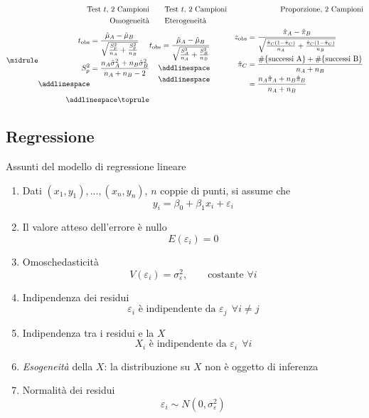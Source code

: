\documentclass[
  11pt,
]{book}
\providecommand{\tightlist}{%
  \setlength{\itemsep}{0pt}\setlength{\parskip}{0pt}}
\theoremstyle{mytheoremstyle}
\theoremstyle{mydefstyle}
\begin{document}
\begin{align*}
    \text{Test $t$, 2 Campioni} &
    \text{\qquad Test $t$, 2 Campioni} &
    \text{Proporzione, 2 Campioni} \\
    \text{Omogeneità} &
    \text{\qquad Eterogeneità} &
     \\
    \midrule
    \begin{aligned}
      t_{\text{obs}}&=\frac{\hat\mu_A-\hat\mu_B}{\sqrt{\frac{S_p^2}{n_A}+\frac{S_p^2}{n_B}}}\\
      S^2_p &= \frac{n_A\hat\sigma_A^2+n_B\hat\sigma_B^2}{n_A+n_B-2}\\
      \addlinespace \\
    \end{aligned} &
    \begin{aligned}
      \displaystyle t_{\text{obs}}=\frac{\hat\mu_A-\hat\mu_B}{\sqrt{\frac{S_A^2}{n_A}+\frac{S_B^2}{n_B}}}\\
      \addlinespace \\ \addlinespace \\
    \end{aligned} &
    \begin{aligned}
      z_{\text{obs}} &=\frac{\hat\pi_A-\hat\pi_B}{\sqrt{\frac{\hat\pi_C(1-\hat\pi_C)}{n_A}+\frac{\hat\pi_C(1-\hat\pi_C)}{n_B}}}\\
      \hat\pi_C &=\frac{\#\{\text{successi A}\}+\#\{\text{successi B}\}}{n_A+n_B}\\
                &=\frac{n_A\hat\pi_A+n_B\hat\pi_B}{n_A+n_B}
    \end{aligned} \\
    \addlinespace
    \toprule
\end{align*}

\subsection{Regressione}\label{regressione}

Assunti del modello di regressione lineare

\begin{enumerate}
\def\labelenumi{\arabic{enumi}.}
\setcounter{enumi}{-1}
\tightlist
\item
  Dati \((x_1,y_1),...,(x_n,y_n)\), \(n\) coppie di punti, si assume che
  \[y_i=\beta_0+\beta_1x_i+\varepsilon_i\]
\item
  Il valore atteso dell'errore è nullo
  \[E(\varepsilon_i)=0\]
\item
  Omoschedasticità
  \[V(\varepsilon_{i}) = \sigma_\varepsilon^2,\qquad \text{costante }\forall i\]
\item
  Indipendenza dei residui
  \[\varepsilon_i\text{ è indipendente da }\varepsilon_j~~\forall i\neq j\]
\item
  Indipendenza tra i residui e la \(X\)
  \[X_i\text{ è indipendente da }\varepsilon_i~~\forall i\]
\item
  \emph{Esogeneità} della \(X\): la distribuzione su \(X\) non è oggetto di inferenza
\item
  Normalità dei residui
  \[\varepsilon_i\sim N(0,\sigma^2_\varepsilon)\]
\end{enumerate}
\end{document}
